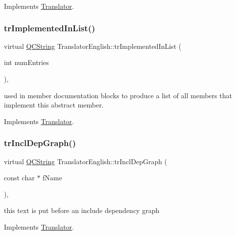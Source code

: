 Implements \mbox{\hyperlink{class_translator}{Translator}}.

\mbox{\label{class_translator_english_a5669370d5c2192e0c33d931e4885cb3a}} 
\subsubsection{\texorpdfstring{trImplementedInList()}{trImplementedInList()}}
{\footnotesize\ttfamily virtual \mbox{\hyperlink{class_q_c_string}{Q\+C\+String}} Translator\+English\+::tr\+Implemented\+In\+List (\begin{DoxyParamCaption}\item[{int}]{num\+Entries }\end{DoxyParamCaption})\hspace{0.3cm}{\ttfamily [inline]}, {\ttfamily [virtual]}}

used in member documentation blocks to produce a list of all members that implement this abstract member. 

Implements \mbox{\hyperlink{class_translator}{Translator}}.

\mbox{\label{class_translator_english_a2fa15ea36074526a18f88ee8583cce99}} 
\subsubsection{\texorpdfstring{trInclDepGraph()}{trInclDepGraph()}}
{\footnotesize\ttfamily virtual \mbox{\hyperlink{class_q_c_string}{Q\+C\+String}} Translator\+English\+::tr\+Incl\+Dep\+Graph (\begin{DoxyParamCaption}\item[{const char $\ast$}]{f\+Name }\end{DoxyParamCaption})\hspace{0.3cm}{\ttfamily [inline]}, {\ttfamily [virtual]}}

this text is put before an include dependency graph 

Implements \mbox{\hyperlink{class_translator}{Translator}}.

\mbox{\label{class_translator_english_af8b38bbee259dfbbf1bf3bfda1459498}} 
